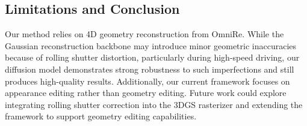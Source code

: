 
\subsection{Limitations and Conclusion}


Our method relies on 4D geometry reconstruction from OmniRe. While the Gaussian reconstruction backbone may introduce minor geometric inaccuracies because of rolling shutter distortion, particularly during high-speed driving, our diffusion model demonstrates strong robustness to such imperfections and still produces high-quality results. Additionally, our current framework focuses on appearance editing rather than geometry editing. Future work could explore integrating rolling shutter correction into the 3DGS rasterizer and extending the framework to support geometry editing capabilities.


